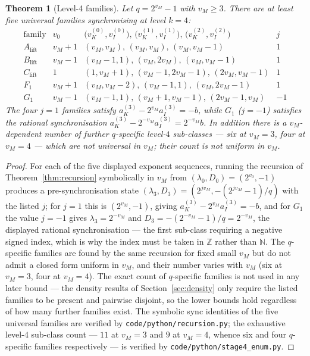 \documentclass[11pt,reqno]{amsart}
\theoremstyle{plain}
\newtheorem{theorem}{Theorem}[section]
\theoremstyle{definition}
\theoremstyle{remark}
\newcommand{\Z}{\mathbb{Z}}
\newcommand{\N}{\mathbb{N}}
\newcommand{\vk}{v_{K}}
\newcommand{\vi}{v_{I}}
\newcommand{\aK}{a_{K}}
\newcommand{\aI}{a_{I}}
\newcommand{\vM}{v_{M}}
\newcommand{\srcpath}[1]{\nolinkurl{#1}}
\begin{document}
\begin{theorem}[Level-4 families]\label{thm:stage4}
Let $q = 2^{\vM} - 1$ with $\vM \ge 3$. There are at least five universal
families synchronising at level $k = 4$:
\[
\renewcommand{\arraystretch}{1.2}
\begin{array}{c|c|c|c}
\text{family} & v_0 & \big(\vk^{(0)},\vi^{(0)}\big),\,\big(\vk^{(1)},\vi^{(1)}\big),\,\big(\vk^{(2)},\vi^{(2)}\big) & j \\ \hline
A_{\mathrm{lift}} & \vM + 1 & (\vM, \vM),\,(\vM, \vM),\,(\vM, \vM - 1) & 1 \\
B_{\mathrm{lift}} & \vM - 1 & (\vM - 1, 1),\,(\vM, 2\vM),\,(\vM, \vM - 1) & 1 \\
C_{\mathrm{lift}} & 1       & (1, \vM + 1),\,(\vM - 1, 2\vM - 1),\,(2\vM, \vM - 1) & 1 \\
F_1               & \vM + 1 & (\vM, \vM - 2),\,(\vM - 1, 1),\,(\vM, 2\vM - 1) & 1 \\
G_1               & \vM - 1 & (\vM - 1, 1),\,(\vM + 1, \vM - 1),\,(2\vM - 1, \vM) & -1
\end{array}
\]
The four $j = 1$ families satisfy
$\aK^{(3)} - 2^{\vM}\aI^{(3)} = -b$, while $G_1$ ($j = -1$) satisfies the
rational synchronisation $\aK^{(3)} - 2^{-\vM}\aI^{(3)} = 2^{-\vM} b$. In
addition there is a $\vM$-dependent number of further $q$-specific level-$4$
sub-classes --- six at $\vM = 3$, four at $\vM = 4$ --- which are not universal
in $\vM$; their count is not uniform in $\vM$.
\end{theorem}

\begin{proof}
For each of the five displayed exponent sequences, running the recursion of
Theorem~\ref{thm:recursion} symbolically in $\vM$ from $(\lambda_0, D_0) =
(2^{v_0}, -1)$ produces a pre-synchronisation state $(\lambda_3, D_3) =
(2^{j\vM}, -(2^{j\vM} - 1)/q)$ with the listed $j$; for $j = 1$ this is
$(2^{\vM}, -1)$, giving $\aK^{(3)} - 2^{\vM}\aI^{(3)} = -b$, and for $G_1$
the value $j = -1$ gives $\lambda_3 = 2^{-\vM}$ and $D_3 = -(2^{-\vM} - 1)/q
= 2^{-\vM}$, the displayed rational synchronisation --- the first sub-class
requiring a negative signed index, which is why the index must be taken in
$\Z$ rather than $\N$. The $q$-specific families are found by the same
recursion for fixed small $\vM$ but do not admit a closed form uniform in
$\vM$, and their number varies with $\vM$ (six at $\vM = 3$, four at
$\vM = 4$). The exact count of $q$-specific families is not used in any later
bound --- the density results of Section~\ref{sec:density} only require the
listed families to be present and pairwise disjoint, so the lower bounds hold
regardless of how many further families exist. The symbolic sync identities of
the five universal families are verified by \srcpath{code/python/recursion.py}; the
exhaustive level-$4$ sub-class count --- $11$ at $\vM = 3$ and $9$ at
$\vM = 4$, whence six and four $q$-specific families respectively --- is
verified by \srcpath{code/python/stage4\_enum.py}.
\end{proof}
\end{document}
